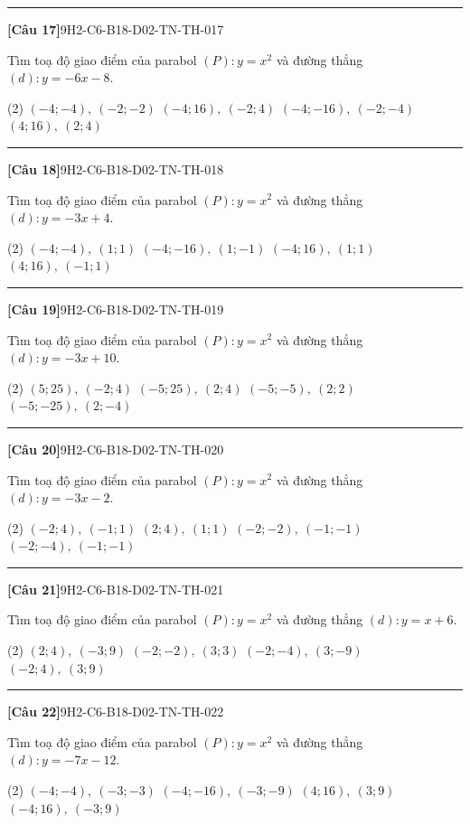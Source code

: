 \documentclass[12pt,a4paper]{article}
\newif\ifloigiai
\newenvironment{cauhoi}[2]{%
  \par\medskip\noindent\rule{\textwidth}{0.4pt}\par\nopagebreak
  \noindent\textbf{[#1]}\hfill{\scriptsize\ttfamily #2}\par\nopagebreak\smallskip}{\par}
\newcommand{\dapan}[1]{\ifloigiai\par\smallskip\noindent\textit{Đáp án:} \textbf{#1}\par\fi}
\begin{document}
\begin{cauhoi}{Câu 17}{9H2-C6-B18-D02-TN-TH-017}
Tìm toạ độ giao điểm của parabol $(P): y=x^{2}$ và đường thẳng $(d): y=-6x-8$.
\begin{tasks}(2)
\task $(-4;-4),\ (-2;-2)$
\task $(-4;16),\ (-2;4)$
\task $(-4;-16),\ (-2;-4)$
\task $(4;16),\ (2;4)$
\end{tasks}
\dapan{B}
\end{cauhoi}
\begin{cauhoi}{Câu 18}{9H2-C6-B18-D02-TN-TH-018}
Tìm toạ độ giao điểm của parabol $(P): y=x^{2}$ và đường thẳng $(d): y=-3x+4$.
\begin{tasks}(2)
\task $(-4;-4),\ (1;1)$
\task $(-4;-16),\ (1;-1)$
\task $(-4;16),\ (1;1)$
\task $(4;16),\ (-1;1)$
\end{tasks}
\dapan{C}
\end{cauhoi}
\begin{cauhoi}{Câu 19}{9H2-C6-B18-D02-TN-TH-019}
Tìm toạ độ giao điểm của parabol $(P): y=x^{2}$ và đường thẳng $(d): y=-3x+10$.
\begin{tasks}(2)
\task $(5;25),\ (-2;4)$
\task $(-5;25),\ (2;4)$
\task $(-5;-5),\ (2;2)$
\task $(-5;-25),\ (2;-4)$
\end{tasks}
\dapan{B}
\end{cauhoi}
\begin{cauhoi}{Câu 20}{9H2-C6-B18-D02-TN-TH-020}
Tìm toạ độ giao điểm của parabol $(P): y=x^{2}$ và đường thẳng $(d): y=-3x-2$.
\begin{tasks}(2)
\task $(-2;4),\ (-1;1)$
\task $(2;4),\ (1;1)$
\task $(-2;-2),\ (-1;-1)$
\task $(-2;-4),\ (-1;-1)$
\end{tasks}
\dapan{A}
\end{cauhoi}
\begin{cauhoi}{Câu 21}{9H2-C6-B18-D02-TN-TH-021}
Tìm toạ độ giao điểm của parabol $(P): y=x^{2}$ và đường thẳng $(d): y=x+6$.
\begin{tasks}(2)
\task $(2;4),\ (-3;9)$
\task $(-2;-2),\ (3;3)$
\task $(-2;-4),\ (3;-9)$
\task $(-2;4),\ (3;9)$
\end{tasks}
\dapan{D}
\end{cauhoi}
\begin{cauhoi}{Câu 22}{9H2-C6-B18-D02-TN-TH-022}
Tìm toạ độ giao điểm của parabol $(P): y=x^{2}$ và đường thẳng $(d): y=-7x-12$.
\begin{tasks}(2)
\task $(-4;-4),\ (-3;-3)$
\task $(-4;-16),\ (-3;-9)$
\task $(4;16),\ (3;9)$
\task $(-4;16),\ (-3;9)$
\end{tasks}
\dapan{D}
\end{cauhoi}
\end{document}
